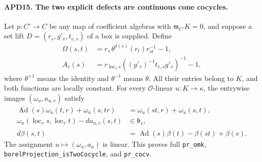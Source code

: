 \documentclass[11pt,a4paper]{article}
\numberwithin{equation}{section}
\theoremstyle{remark}\newtheorem{remark}[theorem]{Remark}
\begin{document}
\paragraph{APD15. The two explicit defects are continuous cone cocycles.}
\label{claim:APD15}
Let \(p:C'\to C\) be any map of coefficient algebras with
\(\mathfrak m_{C'}K=0\), and suppose a set lift
\(D=(r_s,g'_v,t_{v,s})\) of a box is supplied.  Define
\[
 \begin{split}
 \Omega(s,t)&=r_s\,\theta^{\delta(s)}(r_t)r_{st}^{-1}-1,\\
 A_v(s)&=r_{\operatorname{loc}_v s}
               ((g'_v)^{-1}t_{v,s}g'_v)^{-1}-1,
 \end{split}                                                  \tag{APD.26}
\]
where \(\theta^{+1}\) means the identity and
\(\theta^{-1}\) means \(\theta\).  All their entries belong
to \(K\), and both functions are locally constant.  For every
\(\mathcal O\)-linear \(u:K\to\kappa\), the entrywise
images \((\omega_u,a_{u,v})\) satisfy
\[
 \begin{split}
 \overline{\operatorname{Ad}}(s)\omega_u(t,r)+\omega_u(s,tr)
                 &=\omega_u(st,r)+\omega_u(s,t),\\
 \omega_u(\operatorname{loc}_v s,\operatorname{loc}_v t)
      -d a_{u,v}(s,t)&\in\mathfrak b_v,\\
 d\beta(s,t)&=\overline{\operatorname{Ad}}(s)\beta(t)
                                  -\beta(st)+\beta(s).
 \end{split}                                                  \tag{APD.27}
\]
The assignment \(u\mapsto(\omega_u,a_u)\) is linear.
This proves full \texttt{pr\_\allowbreak omk},
\texttt{borel\allowbreak Projection\_\allowbreak is\allowbreak Two\allowbreak Cocycle}, and \texttt{pr\_\allowbreak cocv}.
\end{document}
